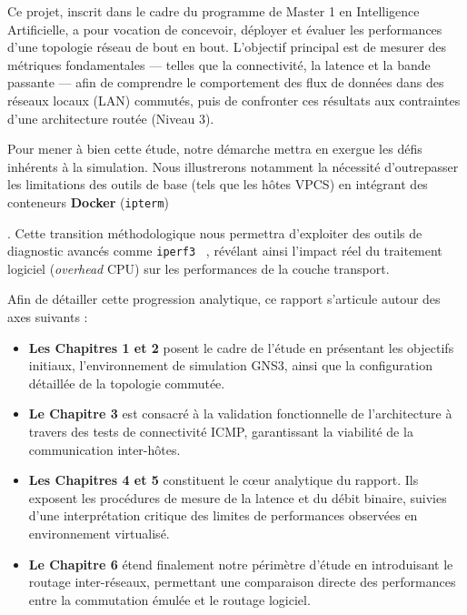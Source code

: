 \documentclass[11pt,a4paper,oneside]{report}
\begin{document}
Ce projet, inscrit dans le cadre du programme de Master 1 en Intelligence Artificielle, a pour vocation de concevoir, d\'{e}ployer et \'{e}valuer les performances d'une topologie r\'{e}seau de bout en bout. L'objectif principal est de mesurer des m\'{e}triques fondamentales --- telles que la connectivit\'{e}, la latence et la bande passante --- afin de comprendre le comportement des flux de donn\'{e}es dans des r\'{e}seaux locaux (LAN) commut\'{e}s, puis de confronter ces r\'{e}sultats aux contraintes d'une architecture rout\'{e}e (Niveau 3).

Pour mener \`{a} bien cette \'{e}tude, notre d\'{e}marche mettra en exergue les d\'{e}fis inh\'{e}rents \`{a} la simulation. Nous illustrerons notamment la n\'{e}cessit\'{e} d'outrepasser les limitations des outils de base (tels que les h\^{o}tes VPCS) en int\'{e}grant des conteneurs \textbf{Docker} (\texttt{ipterm})~\cite{docker2026}

. Cette transition m\'{e}thodologique nous permettra d'exploiter des outils de diagnostic avanc\'{e}s comme \texttt{iperf3}~\cite{iperf32026}
, r\'{e}v\'{e}lant ainsi l'impact r\'{e}el du traitement logiciel (\textit{overhead} CPU) sur les performances de la couche transport.

Afin de d\'{e}tailler cette progression analytique, ce rapport s'articule autour des axes suivants :

\begin{itemize}[leftmargin=*, itemsep=4pt]
  \item \textbf{Les Chapitres 1 et 2} posent le cadre de l'\'{e}tude en pr\'{e}sentant les objectifs initiaux, l'environnement de simulation GNS3, ainsi que la configuration d\'{e}taill\'{e}e de la topologie commut\'{e}e.
  \item \textbf{Le Chapitre 3} est consacr\'{e} \`{a} la validation fonctionnelle de l'architecture \`{a} travers des tests de connectivit\'{e} ICMP, garantissant la viabilit\'{e} de la communication inter-h\^{o}tes.
  \item \textbf{Les Chapitres 4 et 5} constituent le c\oe{}ur analytique du rapport. Ils exposent les proc\'{e}dures de mesure de la latence et du d\'{e}bit binaire, suivies d'une interpr\'{e}tation critique des limites de performances observ\'{e}es en environnement virtualis\'{e}.
  \item \textbf{Le Chapitre 6} \'{e}tend finalement notre p\'{e}rim\`{e}tre d'\'{e}tude en introduisant le routage inter-r\'{e}seaux, permettant une comparaison directe des performances entre la commutation \'{e}mul\'{e}e et le routage logiciel.
\end{itemize}
\end{document}
